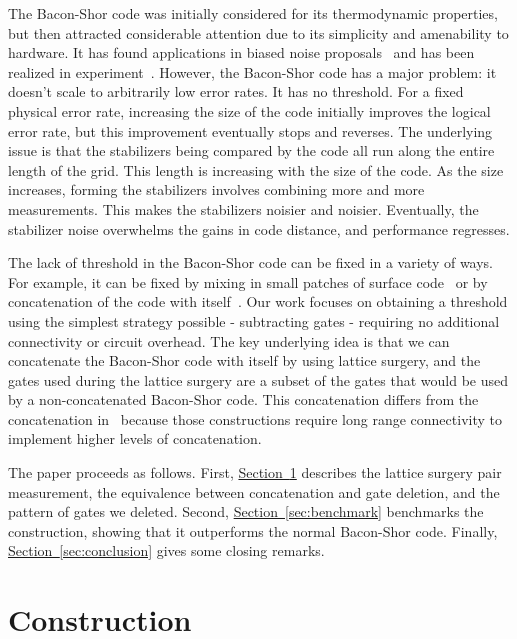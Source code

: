 \documentclass[onecolumn,unpublished,a4paper]{quantumarticle}
\theoremstyle{definition}
\theoremstyle{definition}
\theoremstyle{definition}
\renewcommand{\sec}[1]{\hyperref[sec:#1]{Section~\ref*{sec:#1}}}
\begin{document}
The Bacon-Shor code was initially considered for its thermodynamic properties, but then attracted considerable attention due to its simplicity\cite{aliferis2007subsystem} and amenability to hardware.
It has found applications in biased noise proposals~\cite{li2019compasslerpsurface, huang2020fault, napp2012optimal, brooks2013fault} and has been realized in experiment~\cite{li2018direct, egan2021fault}.
However, the Bacon-Shor code has a major problem: it doesn't scale to arbitrarily low error rates.
It has no threshold.
For a fixed physical error rate, increasing the size of the code initially improves the logical error rate, but this improvement eventually stops and reverses.
The underlying issue is that the stabilizers being compared by the code all run along the entire length of the grid.
This length is increasing with the size of the code.
As the size increases, forming the stabilizers involves combining more and more measurements.
This makes the stabilizers noisier and noisier.
Eventually, the stabilizer noise overwhelms the gains in code distance, and performance regresses.

The lack of threshold in the Bacon-Shor code can be fixed in a variety of ways.
For example, it can be fixed by mixing in small patches of surface code~\cite{li2019compasslerpsurface} or by concatenation of the code with itself~\cite{aliferis2007subsystem, cross2007comparative}.
Our work focuses on obtaining a threshold using the simplest strategy possible - subtracting gates - requiring no additional connectivity or circuit overhead.
The key underlying idea is that we can concatenate the Bacon-Shor code with itself by using lattice surgery, and the gates used during the lattice surgery are a subset of the gates that would be used by a non-concatenated Bacon-Shor code.  This concatenation differs from the concatenation in~\cite{aliferis2007subsystem, cross2007comparative} because those constructions require long range connectivity to implement higher levels of concatenation.

The paper proceeds as follows.
First, \sec{construction} describes the lattice surgery pair measurement, the equivalence between concatenation and gate deletion, and the pattern of gates we deleted.
Second, \sec{benchmark} benchmarks the construction, showing that it outperforms the normal Bacon-Shor code.
Finally, \sec{conclusion} gives some closing remarks.

\section{Construction}
\label{sec:construction}
\end{document}
